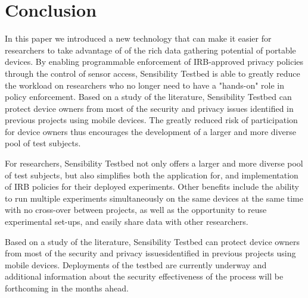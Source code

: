 \section{Conclusion}\label{sec-conclude}

In this paper we introduced a new technology that can make it easier for 
researchers to take advantage of of the rich data gathering potential of 
portable devices.  By enabling programmable enforcement of IRB-approved privacy 
policies through the control of sensor access, Sensibility Testbed is able to greatly 
reduce the workload on researchers who no longer need to have a "hands-on"
role in policy enforcement. Based on a study of the literature, Sensibility Testbed
can protect device owners from most of the security and privacy issues identified
 in previous projects using mobile devices. The greatly reduced risk of participation
 for device owners thus encourages the development of a larger and more diverse pool 
 of test subjects. 


For researchers, Sensibility Testbed not only offers a larger and more diverse pool
of test subjects, but also simplifies both the application for, and implementation
of IRB policies for their deployed experiments. Other benefits include the ability to
run multiple experiments simultaneously on the same devices
at the same time with no cross-over between projects, as well as the opportunity to 
reuse experimental set-ups, and easily share data with other researchers.
 
 Based on a study of the literature, Sensibility Testbed can protect device owners
 from most of the security and privacy issuesidentified in previous projects
 using mobile devices. Deployments of the testbed are currently underway and
 additional information about the security effectiveness of the process will
 be forthcoming in the months ahead.
 

